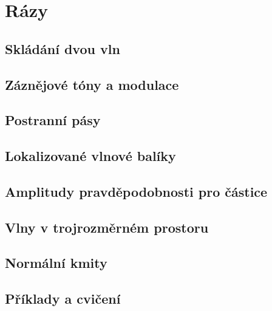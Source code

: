 \chapter{Rázy}\label{fyz:IchapXLVIII}
\minitoc
  \section{Skládání dvou vln}\label{fyz:IchapXLVIIIsecI}
  \section{Záznějové tóny a modulace}\label{fyz:IchapXLVIIIsecII}
  \section{Postranní pásy}\label{fyz:IchapXLVIIIsecIII}
  \section{Lokalizované vlnové balíky}\label{fyz:IchapXLVIIIsecIV}
  \section{Amplitudy pravděpodobnosti pro částice}\label{fyz:IchapXLVIIIsecV}
  \section{Vlny v trojrozměrném prostoru}\label{fyz:IchapXLVIIIsecVI}
  \section{Normální kmity}\label{fyz:IchapXLVIIIsecVII}
  \section{Příklady a cvičení}\label{fyz:IchapXLVIIIsecVIII}